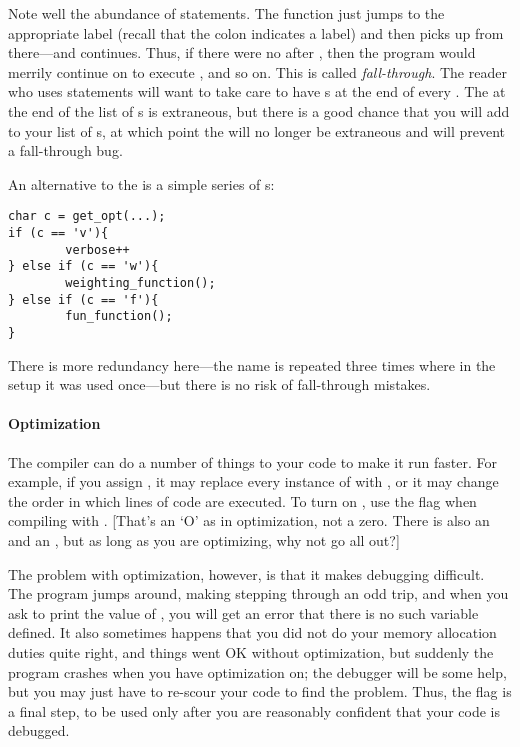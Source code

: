 Note well the abundance of  statements.  The 
function just jumps to the appropriate label (recall that the colon
indicates a label) and then picks up from there---and continues. Thus,
if there were no  after , then the program
would merrily continue on to execute , and so
on. This is called {\sl fall-through}. The
reader who uses  statements will want to take care
to have s at the end of every .  The 
at the end of the list of s is extraneous, but there is a good
chance that you will add to your list of s, at which point
the  will no longer be extraneous and will prevent a fall-through bug.

An alternative to the  is a simple series of s:
\begin{lstlisting}
char c = get_opt(...);
if (c == 'v'){
        verbose++
} else if (c == 'w'){
        weighting_function();
} else if (c == 'f'){
        fun_function();
}
\end{lstlisting}
There is more redundancy here---the name  is repeated three times
where in the  setup it was used once---but there is no risk
of fall-through mistakes.


\paragraph{Optimization} 
The  compiler can do a number of things to your code to make it
run faster. For example, if you assign , it may replace
every instance of  with , or it may change the order
in which lines of code are executed. To turn on ,
use the  flag when compiling with . [That's an `O'
as in optimization, not a zero. There is also an  and an , but as long as you are optimizing, why not go all out?]

The problem with optimization, however, is that it makes debugging
difficult. The program jumps around, making stepping through an odd
trip, and when you ask to print the value of , you will get
an error that there is no such variable defined.
It also sometimes happens that you did not do your memory allocation duties
quite right, and things went OK without optimization, but suddenly the
program crashes when you have optimization on; the debugger will be some
help, but you may just have to re-scour your code to find the problem.
Thus, the  flag is a final step, to be used only after you
are reasonably confident that your code is debugged.

